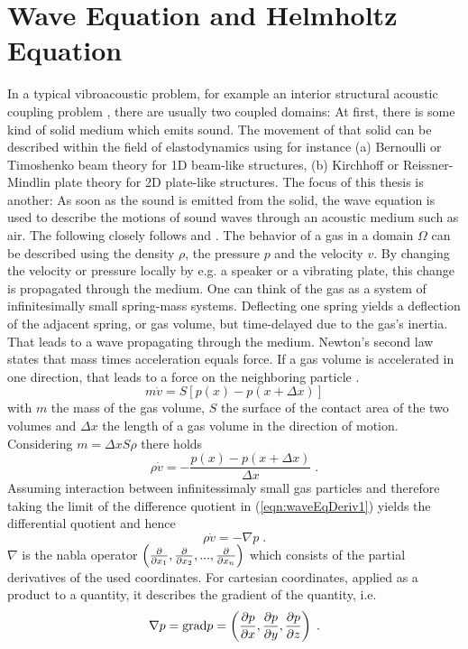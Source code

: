 \documentclass[%
  a4paper,oneside,%
  11pt,%
  smallchapters,
  style=printdev,
  extramargin,
  green,%
  rgb, <cmyk>
  ]{tubsbook}
\begin{document}
\section{Wave Equation and Helmholtz Equation}
In a typical vibroacoustic problem, for example an interior structural acoustic coupling problem \cite{atalla2015}, there are usually two coupled domains: At first, there is some kind of solid medium which emits sound. The movement of that solid can be described within the field of elastodynamics using for instance (a) Bernoulli or Timoshenko beam theory for 1D beam-like structures, (b) Kirchhoff or Reissner-Mindlin plate theory for 2D plate-like structures. The focus of this thesis is another: As soon as the sound is emitted from the solid, the wave equation is used to describe the motions of sound waves through an acoustic medium such as air. 
The following closely follows \cite{larson2013} and \cite{moser2005}.
The behavior of a gas in a domain $\Omega$ can be described using the density $\rho$, the pressure $p$ and the velocity $v$. By changing the velocity or pressure locally by e.g. a speaker or a vibrating plate, this change is propagated through the medium. One can think of the gas as a system of infinitesimally small spring-mass systems. Deflecting one spring yields a deflection of the adjacent spring, or gas volume, but time-delayed due to the gas's inertia. That leads to a wave propagating through the medium. 
Newton's second law states that mass times acceleration equals force. If a gas volume is accelerated in one direction, that leads to a force on the neighboring particle \cite{moser2005}.
%
\begin{equation}
m \dot{v} = S  \left[  p(x) -p(x + \Delta x)  \right] 
\end{equation}
with $m$ the mass of the gas volume, $S$ the surface of the contact area of the two volumes  and $\Delta x$ the length of a gas volume in the direction of motion. Considering $m = \Delta x S \rho$ there holds
\begin{equation}
\rho \dot{v} = - \frac{p(x) -p(x + \Delta x)}{\Delta x} \; .
\label{eqn:waveEqDeriv1}
\end{equation}
Assuming interaction between infinitessimaly small gas particles and therefore taking the limit of the difference quotient in (\ref{eqn:waveEqDeriv1}) yields the differential quotient and hence
\begin{equation}
\rho \dot{v} = - \nabla p \;.
\label{eqn:Tragheitsges}
\end{equation}
$\nabla$ is the nabla operator $\left( \pdv{}{x_1},\pdv{}{x_2},...,\pdv{}{x_n} \right)$ which consists of the partial derivatives of the used coordinates. For cartesian coordinates, applied as a product to a quantity, it describes the gradient of the quantity, i.e.
\begin{equation}
\nabla p = \mathrm{grad}p = \left( \pdv{p}{x},\pdv{p}{y},\pdv{p}{z} \right) \;.
\end{equation}
\end{document}
